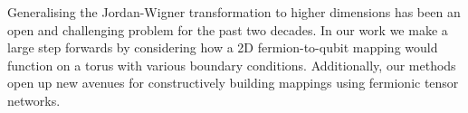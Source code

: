 Generalising the Jordan-Wigner transformation to higher dimensions has been an open and challenging problem for the past two decades. In our work we make a large step forwards by considering how a 2D fermion-to-qubit mapping would function on a torus with various boundary conditions. Additionally, our methods open up new avenues for constructively building mappings using fermionic tensor networks.